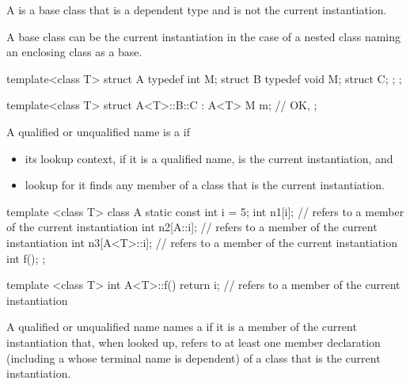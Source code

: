 \pnum
{}%
A  is a base class that is a dependent type and is
not the current instantiation.
\begin{note}
A base class can be the current instantiation in the case of a nested class
naming an enclosing class as a base.
\begin{example}
\begin{codeblock}
template<class T> struct A {
  typedef int M;
  struct B {
    typedef void M;
    struct C;
  };
};

template<class T> struct A<T>::B::C : A<T> {
  M m;                          // OK, 
};
\end{codeblock}
\end{example}
\end{note}

\pnum
{}%
A qualified or unqualified name is a
if
\begin{itemize}
\item
its lookup context, if it is a qualified name,
is the current instantiation, and
\item
lookup for it finds any member of a class that is the current instantiation.
\end{itemize}
\begin{example}
\begin{codeblock}
template <class T> class A {
  static const int i = 5;
  int n1[i];                    //  refers to a member of the current instantiation
  int n2[A::i];                 //  refers to a member of the current instantiation
  int n3[A<T>::i];              //  refers to a member of the current instantiation
  int f();
};

template <class T> int A<T>::f() {
  return i;                     //  refers to a member of the current instantiation
}
\end{codeblock}
\end{example}

%
A qualified or unqualified name names a  if it is a
member of the current instantiation that, when looked up, refers to at least
one member declaration
(including a  whose terminal name is dependent)
of a class that is the current instantiation.

